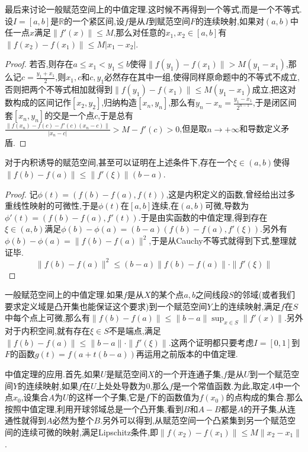 最后来讨论一般赋范空间上的中值定理.这时候不再得到一个等式,而是一个不等式.设$I=[a,b]$是$\mathbb{R}$的一个紧区间,设$f$是从$I$到赋范空间$F$的连续映射,如果对$(a,b)$中任一点$x$满足$\|f'(x)\|\le M$,那么对任意的$x_1,x_2\in[a,b]$有$\|f(x_2)-f(x_1)\|\le M|x_1-x_2|$.
\begin{proof}
	
	若否,则存在$a\le x_1<y_1\le b$使得$\|f(y_1)-f(x_1)\|>M(y_1-x_1)$,那么记$c=\frac{y_1+x_1}{2}$,则$x_1,c$和$c,y_1$必然存在其中一组,使得同样原命题中的不等式不成立,否则把两个不等式相加就得到$\|f(y_1)-f(x_1)\|\le M(y_1-x_1)$成立,把这对数构成的区间记作$[x_2,y_2]$,归纳构造$[x_n,y_n]$,那么有$y_n-x_n=\frac{y_1-x_1}{2^{n-1}}$,于是闭区间套$[x_n,y_n]$的交是一个点$c$,于是总有$\frac{\|f(x_n)-f(c)-f'(c)(x_n-c)\|}{|x_n-c|}>M-f'(c)>0$,但是取$n\to+\infty$和导数定义矛盾.
	
\end{proof}

对于内积诱导的赋范空间,甚至可以证明在上述条件下,存在一个$\xi\in(a,b)$使得$\|f(b)-f(a)\|\le\|f'(\xi)\|(b-a)$.
\begin{proof}
	
	记$\phi(t)=(f(b)-f(a),f(t))$,这是内积定义的函数,曾经给出过多重线性映射的可微性,于是$\phi(t)$在$[a,b]$连续,在$(a,b)$可微,导数为$\phi'(t)=(f(b)-f(a),f'(t))$.于是由实函数的中值定理,得到存在$\xi\in(a,b)$满足$\phi(b)-\phi(a)=(b-a)(f(b)-f(a),f'(\xi))$.另外有$\phi(b)-\phi(a)=\|f(b)-f(a)\|^2$,于是从Cauchy不等式就得到下式,整理就证毕.
	$$\|f(b)-f(a)\|^2\le(b-a)\|f(b)-f(a)\|\cdot\|f'(\xi)\|$$
	
\end{proof}

一般赋范空间上的中值定理.如果$f$是从$X$的某个点$a,b$之间线段$S$的邻域(或者我们要求定义域是凸开集也能保证这个要求)到一个赋范空间$Y$上的连续映射,满足$f$在$S$中每个点上可微,那么有$\|f(b)-f(a)\|\le\|b-a\|\sup_{x\in S}\|f'(x)\|$.另外对于内积空间,就有存在$\xi\in S$不是端点,满足$\|f(b)-f(a)\|\le\|b-a\|\cdot\|f'(\xi)\|$.这两个证明都只要考虑$I=[0,1]$到$F$的函数$g(t)=f(a+t(b-a))$再运用之前版本的中值定理.

中值定理的应用.首先,如果$U$是赋范空间$X$的一个开连通子集,$f$是从$U$到一个赋范空间$Y$的连续映射,如果$f$在$U$上处处导数为0,那么$f$是一个常值函数.为此,取定$A$中一个点$x_0$,设集合$A$为$U$的这样一个子集,它是$f$下的函数值为$f(x_0)$的点构成的集合.那么按照中值定理,利用开球邻域总是一个凸开集,看到$B$和$A-B$都是$A$的开子集,从连通性就得到$A$必然为整个$B$.另外可以得到,从赋范空间一个凸紧集到另一个赋范空间的连续可微的映射,满足Lipschitz条件,即$\|f(x_2)-f(x_1)\|\le M\|x_2-x_1\|$.

